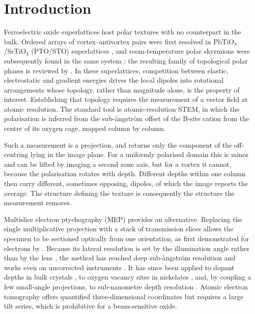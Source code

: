 \documentclass[aps,prb,twocolumn,superscriptaddress,floatfix,nofootinbib]{revtex4-2}
\begin{document}
\maketitle
\section{Introduction}

Ferroelectric oxide superlattices host polar textures with no counterpart in the bulk. Ordered
arrays of vortex--antivortex pairs were first resolved in PbTiO$_3$/SrTiO$_3$ (PTO/STO)
superlattices \citep{Yadav2016}, and room-temperature polar skyrmions were subsequently found in
the same system \citep{Das2019}; the resulting family of topological polar phases is reviewed by
\citet{Junquera2023}. In these superlattices, competition between elastic, electrostatic and
gradient energies drives the local dipoles into rotational arrangements whose topology, rather
than magnitude alone, is the property of interest. Establishing that topology requires the
measurement of a vector field at atomic resolution. The standard tool is atomic-resolution STEM,
in which the polarisation is inferred from the sub-\aa{}ngstr\"om offset of the B-site cation
from the centre of its oxygen cage, mapped column by column.

Such a measurement is a projection, and returns only the component of the off-centring lying in
the image plane. For a uniformly polarised domain this is minor and can be lifted by imaging a
second zone axis, but for a vortex it cannot, because the polarisation rotates with depth.
Different depths within one column then carry different, sometimes opposing, dipoles, of which
the image reports the average. The structure defining the texture is consequently the structure
the measurement removes.

Multislice electron ptychography (MEP) provides an alternative. Replacing the single
multiplicative projection with a stack of transmission slices \citep{MaidenHumphryRodenburg2012}
allows the specimen to be sectioned optically from one orientation, as first demonstrated for
electrons by \citet{Gao2017}. Because its lateral resolution is set by the illumination angle
rather than by the lens \citep{Nellist1995}, the method has reached deep sub-\aa{}ngstr\"om
resolution \citep{Jiang2018} and works even on uncorrected instruments \citep{Nguyen2024}. It
has since been applied to dopant depths in bulk crystals \citep{Chen2021}, to oxygen vacancy
sites in nickelates \citep{Dong2024}, and, by coupling a few small-angle projections, to
sub-nanometre depth resolution \citep{Dong2025}. Atomic electron tomography offers quantified
three-dimensional coordinates \citep{Yang2017} but requires a large tilt series, which is
prohibitive for a beam-sensitive oxide.
\end{document}
